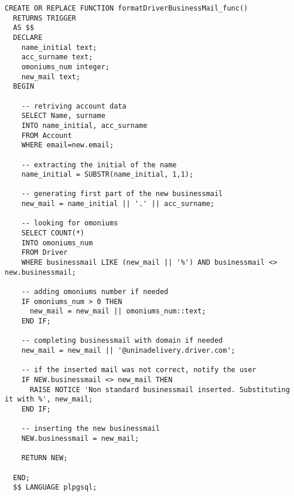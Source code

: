 \newpage

\begin{lstlisting}[caption={Funzione per il vincolo \textbf{formatDriverBusinessmail}}]
  CREATE OR REPLACE FUNCTION formatDriverBusinessMail_func()
  RETURNS TRIGGER
  AS $$
  DECLARE
    name_initial text;
    acc_surname text;
    omoniums_num integer;
    new_mail text;
  BEGIN

    -- retriving account data
    SELECT Name, surname
    INTO name_initial, acc_surname
    FROM Account
    WHERE email=new.email;

    -- extracting the initial of the name
    name_initial = SUBSTR(name_initial, 1,1);

    -- generating first part of the new businessmail
    new_mail = name_initial || '.' || acc_surname;

    -- looking for omoniums
    SELECT COUNT(*)
    INTO omoniums_num
    FROM Driver
    WHERE businessmail LIKE (new_mail || '%') AND businessmail <> new.businessmail;

    -- adding omoniums number if needed
    IF omoniums_num > 0 THEN
      new_mail = new_mail || omoniums_num::text;
    END IF;

    -- completing businessmail with domain if needed
    new_mail = new_mail || '@uninadelivery.driver.com';

    -- if the inserted mail was not correct, notify the user
    IF NEW.businessmail <> new_mail THEN
      RAISE NOTICE 'Non standard businessmail inserted. Substituting it with %', new_mail;
    END IF;

    -- inserting the new businessmail
    NEW.businessmail = new_mail;

    RETURN NEW;

  END;
  $$ LANGUAGE plpgsql;
\end{lstlisting}
\newpage
